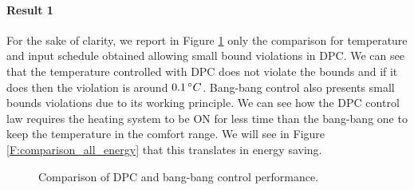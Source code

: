 \paragraph{Result 1} For the sake of clarity, we report in Figure \ref{F:comparison_small} only the comparison for temperature and input schedule obtained allowing small bound violations in DPC. We can see that the temperature controlled with DPC does not violate the bounds and if it does then the violation is around $0.1\,\degree C$. Bang-bang control also presents small bounds violations due to its working principle. We can see how the DPC control law requires the heating system to be ON for less time than the bang-bang one to keep the temperature in the comfort range. We will see in Figure \ref{F:comparison_all_energy} that this translates in energy saving.

\begin{figure}[h!]
	\begin{center}
	\end{center}
	\caption{Comparison of DPC and bang-bang control performance.}
	\captionsetup{justification=centering}
	\label{F:comparison_small}
\end{figure}

